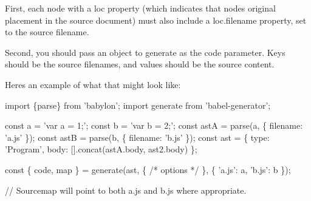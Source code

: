 First, each node with a {\ttfamily loc} property (which indicates that node\textquotesingle{}s original placement in the source document) must also include a {\ttfamily loc.\+filename} property, set to the source filename.

Second, you should pass an object to {\ttfamily generate} as the {\ttfamily code} parameter. Keys should be the source filenames, and values should be the source content.

Here\textquotesingle{}s an example of what that might look like\+:


\begin{DoxyCode}
import \{parse\} from 'babylon';
import generate from 'babel-generator';

const a = 'var a = 1;';
const b = 'var b = 2;';
const astA = parse(a, \{ filename: 'a.js' \});
const astB = parse(b, \{ filename: 'b.js' \});
const ast = \{
  type: 'Program',
  body: [].concat(astA.body, ast2.body)
\};

const \{ code, map \} = generate(ast, \{ /* options */ \}, \{
  'a.js': a,
  'b.js': b
\});

// Sourcemap will point to both a.js and b.js where appropriate.
\end{DoxyCode}
 
